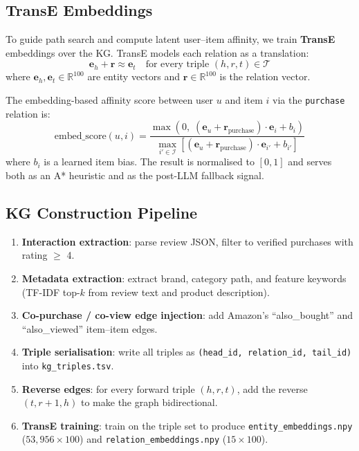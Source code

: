 \documentclass[12pt,a4paper]{article}
\begin{document}
\subsection{TransE Embeddings}

To guide path search and compute latent user--item affinity,
we train \textbf{TransE} \cite{bordes2013translating} embeddings over the KG.
TransE models each relation as a translation:
\begin{equation}
  \mathbf{e}_h + \mathbf{r} \approx \mathbf{e}_t
  \quad \text{for every triple } (h, r, t) \in \mathcal{T}
\end{equation}
where $\mathbf{e}_h, \mathbf{e}_t \in \mathbb{R}^{100}$ are entity vectors and
$\mathbf{r} \in \mathbb{R}^{100}$ is the relation vector.

The embedding-based affinity score between user $u$ and item $i$ via the
\texttt{purchase} relation is:
\begin{equation}
  \text{embed\_score}(u, i) =
  \frac{\max(0,\; (\mathbf{e}_u + \mathbf{r}_{\text{purchase}}) \cdot \mathbf{e}_i + b_i)}
       {\displaystyle\max_{i' \in \mathcal{I}}
        [(\mathbf{e}_u + \mathbf{r}_{\text{purchase}}) \cdot \mathbf{e}_{i'} + b_{i'}]}
  \label{eq:embed}
\end{equation}
where $b_i$ is a learned item bias. The result is normalised to $[0, 1]$
and serves both as an A* heuristic and as the post-LLM fallback signal.

\subsection{KG Construction Pipeline}

\begin{enumerate}[leftmargin=2em]
  \item \textbf{Interaction extraction}: parse review JSON, filter to verified
        purchases with rating $\geq$ 4.
  \item \textbf{Metadata extraction}: extract brand, category path, and feature
        keywords (TF-IDF top-$k$ from review text and product description).
  \item \textbf{Co-purchase / co-view edge injection}: add Amazon's
        ``also\_bought'' and ``also\_viewed'' item--item edges.
  \item \textbf{Triple serialisation}: write all triples as
        \texttt{(head\_id, relation\_id, tail\_id)} into \texttt{kg\_triples.tsv}.
  \item \textbf{Reverse edges}: for every forward triple $(h, r, t)$,
        add the reverse $(t, r{+}1, h)$ to make the graph bidirectional.
  \item \textbf{TransE training}: train on the triple set to produce
        \texttt{entity\_embeddings.npy} ($53{,}956 \times 100$) and
        \texttt{relation\_embeddings.npy} ($15 \times 100$).
\end{enumerate}
\end{document}
